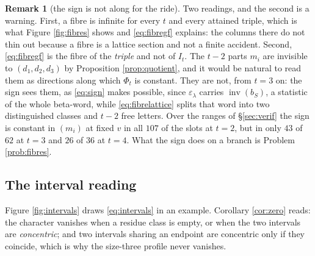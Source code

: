 \documentclass[11pt,reqno]{amsart}
\theoremstyle{plain}
\theoremstyle{definition}
\newtheorem{remark}[theorem]{Remark}
\newcommand{\inv}{\operatorname{inv}}
\begin{document}
\begin{remark}[the sign is not along for the ride]\label{rem:signsees}
Two readings, and the second is a warning. First, a fibre is infinite for every $t$ and every
attained triple, which is what Figure \ref{fig:fibres} shows and \eqref{eq:fibregf} explains: the
columns there do not thin out because a fibre is a lattice section and not a finite accident.
Second, \eqref{eq:fibregf} is the fibre of the \emph{triple} and not of $I_t$. The $t-2$ parts $m_i$
are invisible to $(d_1,d_2,d_3)$ by Proposition \ref{prop:quotient}, and it would be natural to read
them as directions along which $\Phi_t$ is constant. They are not, from $t=3$ on: the sign sees them,
as \eqref{eq:sign} makes possible, since $\varepsilon_\lambda$ carries $\inv(b_S)$, a statistic of
the whole beta-word, while \eqref{eq:fibrelattice} splits that word into two distinguished classes
and $t-2$ free letters. Over the ranges of \S\ref{sec:verif} the sign is constant in $(m_i)$ at fixed
$v$ in all $107$ of the slots at $t=2$, but in only $43$ of $62$ at $t=3$ and $26$ of $36$ at $t=4$.
What the sign does on a branch is Problem \ref{prob:fibres}.
\end{remark}

\subsection{The interval reading}\label{sec:intervals}
Figure \ref{fig:intervals} draws \eqref{eq:intervals} in an example. Corollary \ref{cor:zero} reads:
the character vanishes when a residue class is empty, or when the two intervals are
\emph{concentric}; and two intervals sharing an endpoint are concentric only if they coincide, which
is why the size-three profile never vanishes.
\end{document}
